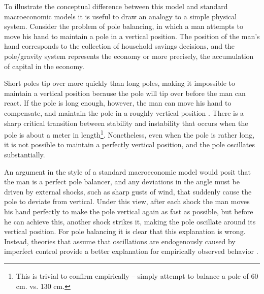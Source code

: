 To illustrate the conceptual difference between this model and standard macroeconomic models it is useful to draw an analogy to a simple physical system. Consider the problem of pole balancing, in which a man attempts to move his hand to maintain a pole in a vertical position. The position of the man's hand corresponds to the collection of household savings decisions, and the pole/gravity system represents the economy or more precisely, the accumulation of capital in the economy. 
%

Short poles tip over more quickly than long poles, making it impossible to maintain a vertical position because the pole will tip over before the man can react.  If the pole is long enough, however, the man can move his hand to compensate, and maintain the pole in a roughly vertical position \citep{insperger2017stick}.  There is a sharp critical transition between stability and instability that occurs when the pole is about a meter in length\footnote{This is trivial to confirm empirically -- simply attempt to balance a pole of 60 cm. vs. 130 cm.}.
Nonetheless, even when the pole is rather long, it is not possible to maintain a perfectly vertical position, and the 
pole oscillates substantially.

An argument in the style of a standard macroeconomic model would posit that the man is a perfect pole balancer, and any deviations in the angle must be driven by external shocks, such as sharp gusts of wind, that suddenly cause the pole to deviate from vertical.  Under this view, after each shock the man moves his hand perfectly to make the pole vertical again as fast as possible, but before he can achieve this, another shock strikes it, making the pole oscillate around its vertical position.  For pole balancing it is clear that this explanation is wrong. Instead, theories that assume that oscillations are endogenously caused by imperfect control provide a better explanation for empirically observed behavior \citep{insperger2017stick}.

